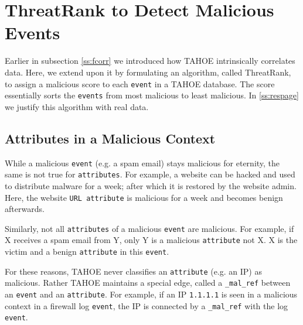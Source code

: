 
\section{ThreatRank to Detect Malicious Events}\label{sec:pagerank}


Earlier in subsection \ref{ss:fcorr} we introduced how TAHOE intrinsically correlates data. Here, we extend upon it by formulating  an algorithm, called ThreatRank, to assign a malicious score to each \texttt{event} in a TAHOE database. The score essentially sorts the \texttt{events} from most malicious to least malicious. In \ref{ss:respage} we justify this algorithm with real data.



\iffalse


\subsection{Attributes in a Malicious Context}

While a malicious \texttt{event} (e.g. a spam email) stays malicious for eternity, the same is not true for \texttt{attributes}. For example, a website can be hacked and used to distribute malware for a week; after which it is restored by the website admin. Here, the website \texttt{URL attribute} is malicious for a week and becomes benign afterwards.

Similarly, not all \texttt{attributes} of a malicious \texttt{event} are malicious. For example, if X receives a spam email from Y, only Y is a malicious \texttt{attribute} not X. X is the victim and a benign \texttt{attribute} in this \texttt{event}.

For these reasons, TAHOE never classifies an \texttt{attribute} (e.g. an IP) as malicious. Rather TAHOE maintains a special edge, called a \texttt{\_mal\_ref} between an \texttt{event} and an \texttt{attribute}. For example, if an IP \texttt{1.1.1.1} is seen in a malicious context in a firewall log \texttt{event}, the IP is connected by a \texttt{\_mal\_ref} with the log \texttt{event}.

